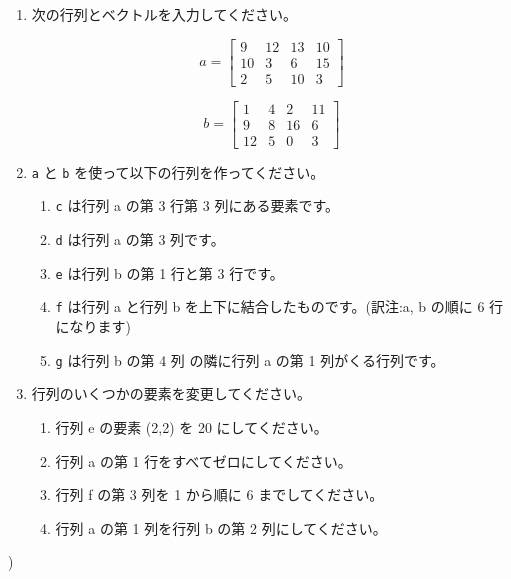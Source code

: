 \documentclass{jsarticle}
\begin{document}
\begin{boxnote}

\begin{enumerate}
\item 次の行列とベクトルを入力してください。

\[
  a = \left[
    \begin{array}{cccc}
      9 & 12 & 13 & 10 \\
      10 & 3 & 6 & 15 \\
      2 & 5 & 10 & 3
    \end{array}
  \right]
\]


\[
  b = \left[
    \begin{array}{cccc}
      1 & 4 & 2 & 11 \\
      9 & 8 & 16 & 6 \\
      12 & 5 & 0 & 3
    \end{array}
  \right]
\]


\item {\tt a} と {\tt b} を使って以下の行列を作ってください。
  \begin{enumerate}
  \item {\tt c} は行列 a の第 3 行第 3 列にある要素です。
  \item {\tt d} は行列 a の第 3 列です。
  \item {\tt e} は行列 b の第 1 行と第 3 行です。
  \item {\tt f} は行列 a と行列 b を上下に結合したものです。(訳注:a, b の順に 6 行になります)
  \item {\tt g} は行列 b の第 4 列 の隣に行列 a の第 1 列がくる行列です。
\end{enumerate}

\item 行列のいくつかの要素を変更してください。
  \begin{enumerate}
  \item 行列 e の要素 (2,2) を 20 にしてください。
  \item 行列 a の第 1 行をすべてゼロにしてください。
  \item 行列 f の第 3 列を 1 から順に 6 までしてください。
  \item 行列 a の第 1 列を行列 b の第 2 列にしてください。
  \end{enumerate}
\end{enumerate}

\end{boxnote}



)
\end{document}
